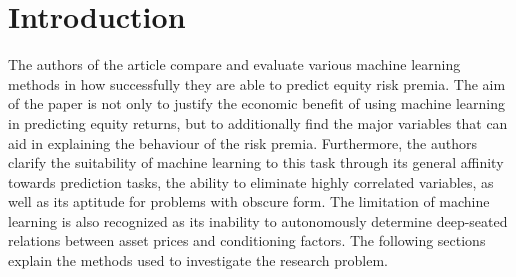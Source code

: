 \section{Introduction}

The authors of the article compare and evaluate various machine learning methods in how successfully they are able to predict equity risk premia. The aim of the paper is not only to justify the economic benefit of using machine learning in predicting equity returns, but to additionally find the major variables that can aid in explaining the behaviour of the risk premia.
\newline\noindent
Furthermore, the authors clarify the suitability of machine learning to this task through its general affinity towards prediction tasks, the ability to eliminate highly correlated variables, as well as its aptitude for problems with obscure form. The limitation of machine learning is also recognized as its inability to autonomously determine deep-seated relations between asset prices and conditioning factors. The following sections explain the methods used to investigate the research problem.
